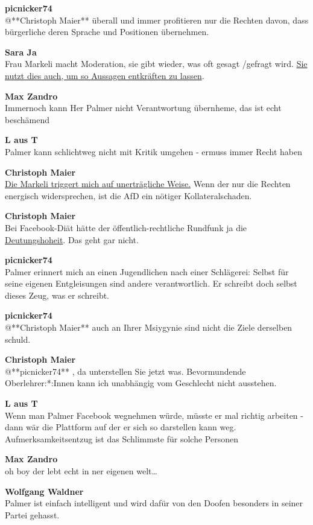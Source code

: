 \documentclass[]{article}
\begin{document}
\textbf{picnicker74}\\
@**Christoph Maier** überall und immer profitieren nur die Rechten
davon, dass bürgerliche deren Sprache und Positionen übernehmen.

\textbf{Sara Ja}\\
Frau Markeli macht Moderation, sie gibt wieder, was oft gesagt /gefragt
wird. \protect\hyperlink{timeout}{Sie nutzt dies auch, um so Aussagen
entkräften zu lassen}.

\textbf{Max Zandro}\\
Immernoch kann Her Palmer nicht Verantwortung übernheme, das ist echt
beschämend

\textbf{L aus T}\\
Palmer kann schlichtweg nicht mit Kritik umgehen - ermuss immer Recht
haben

\textbf{Christoph Maier}\\
\protect\hyperlink{timeout}{Die Markeli triggert mich auf unerträgliche
Weise.} Wenn der nur die Rechten energisch widersprechen, ist die AfD
ein nötiger Kollateralschaden.

\textbf{Christoph Maier}\\
Bei Facebook-Diät hätte der öffentlich-rechtliche Rundfunk ja die
\protect\hyperlink{Deutungshoheit}{Deutungshoheit}. Das geht gar nicht.

\textbf{picnicker74}\\
Palmer erinnert mich an einen Jugendlichen nach einer Schlägerei:
Selbst für seine eigenen Entgleisungen sind andere verantwortlich. Er
schreibt doch selbst dieses Zeug, was er schreibt.

\textbf{picnicker74}\\
@**Christoph Maier** auch an Ihrer Msiygynie sind nicht die Ziele
derselben schuld.

\textbf{Christoph Maier}\\
@**picnicker74** , da unterstellen Sie jetzt was. Bevormundende
Oberlehrer:*:Innen kann ich unabhängig vom Geschlecht nicht ausstehen.

\textbf{L aus T}\\
Wenn man Palmer Facebook wegnehmen würde, müsste er mal richtig
arbeiten - dann wär die Plattform auf der er sich so darstellen kann
weg. Aufmerksamkeitsentzug ist das Schlimmste für solche Personen

\textbf{Max Zandro}\\
oh boy der lebt echt in ner eigenen welt\ldots{}

\textbf{Wolfgang Waldner}\\
Palmer ist einfach intelligent und wird dafür von den Doofen besonders
in seiner Partei gehasst.
\end{document}
